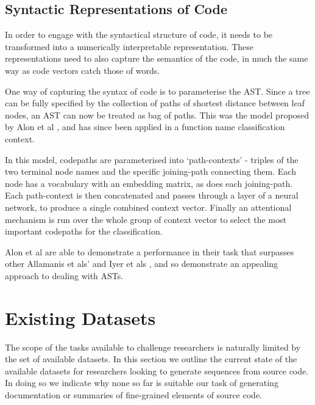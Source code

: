 \subsection{Syntactic Representations of Code}

In order to engage with the syntactical structure of code, it needs to be transformed into a numerically interpretable representation. 
These representations need to also capture the semantics of the code, in much the same way as code vectors catch those of words.


One way of capturing the syntax of code is to parameterise the AST.
Since a tree can be fully specified by the collection of paths of shortest distance between leaf nodes, an AST can now be treated as bag of paths. This was the model proposed by Alon et al \cite{alon_general_2018}, and has since been applied  in a function name classification context\cite{alon_code2vec_2018}.

In this model, codepaths are parameterised into `path-contexts' - triples of the two terminal node names and the specific joining-path connecting them.
Each node has a vocabulary with an embedding matrix, as does each joining-path. Each path-context is then concatenated and passes through a layer of a neural network, to produce a single combined context vector. Finally an attentional mechanism is run over the whole group of context vector to select the most important codepaths for the classification.

Alon et al are able to demonstrate a performance in their task that surpasses other Allamanis et als' \cite{allamanis_convolutional_2016} and Iyer et als \cite{iyer_summarizing_2016}, and so demonstrate an appealing approach to dealing with ASTs.

\section{Existing Datasets}

The scope of the tasks available to challenge researchers is naturally limited by the set of available datasets.
In this section we outline the current state of the available datasets for researchers looking to generate sequences from source code. In doing so we indicate why none so far is suitable our task of generating documentation or summaries of fine-grained elements of source code.

